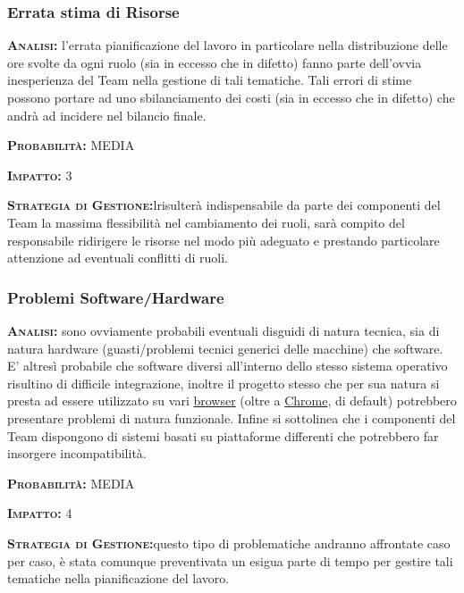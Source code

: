 \subsubsection{Errata stima di Risorse}
\begin{description}
	\item{\scshape\bfseries Analisi:} l'errata pianificazione del lavoro in particolare nella distribuzione delle ore svolte da ogni ruolo (sia in eccesso che in difetto) fanno parte dell'ovvia inesperienza del Team nella gestione di tali tematiche. Tali errori di stime possono portare ad uno sbilanciamento dei costi (sia in eccesso che in difetto) che andrà ad incidere nel bilancio finale.
	\item{\scshape\bfseries Probabilità:} MEDIA
	\item{\scshape\bfseries Impatto:} 3
	\item{\scshape\bfseries Strategia di Gestione:}lrisulterà indispensabile da parte dei componenti del Team la massima flessibilità nel cambiamento dei ruoli, sarà compito del responsabile ridirigere le risorse nel modo più adeguato e prestando particolare attenzione ad eventuali conflitti di ruoli.
\end{description}

\subsubsection{Problemi Software/Hardware}
\begin{description}
	\item{\scshape\bfseries Analisi:} sono ovviamente probabili eventuali disguidi di natura tecnica, sia di natura hardware (guasti/problemi tecnici generici delle macchine) che software. E' altresì probabile che software diversi all'interno dello stesso sistema operativo risultino di difficile integrazione, inoltre il progetto stesso che per sua natura si presta ad essere utilizzato su vari \underline{browser} (oltre a \underline{Chrome}, di default) potrebbero presentare problemi di natura funzionale. Infine si sottolinea che i componenti del Team dispongono di sistemi basati su piattaforme differenti che potrebbero far insorgere incompatibilità.
	\item{\scshape\bfseries Probabilità:} MEDIA
	\item{\scshape\bfseries Impatto:} 4
	\item{\scshape\bfseries Strategia di Gestione:}questo tipo di problematiche andranno affrontate caso per caso, è stata comunque preventivata un esigua parte di tempo per gestire tali tematiche nella pianificazione del lavoro.
\end{description}




